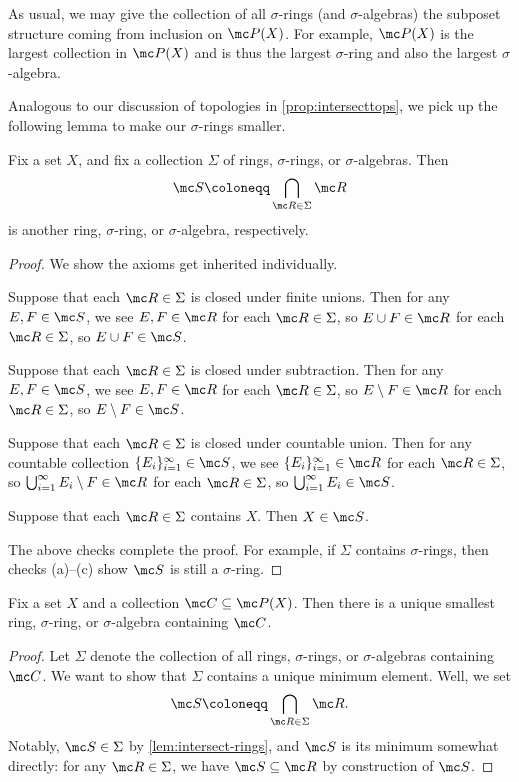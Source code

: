 \documentclass[../notes.tex]{subfiles}
\begin{document}
As usual, we may give the collection of all $\sigma$-rings (and $\sigma$-algebras) the subposet structure coming from inclusion on $\mc P(X)$. For example, $\mc P(X)$ is the largest collection in $\mc P(X)$ and is thus the largest $\sigma$-ring and also the largest $\sigma$-algebra.

Analogous to our discussion of topologies in \autoref{prop:intersecttops}, we pick up the following lemma to make our $\sigma$-rings smaller.
\begin{lemma} \label{lem:intersect-rings}
	Fix a set $X$, and fix a collection $\Sigma$ of rings, $\sigma$-rings, or $\sigma$-algebras. Then
	\[\mc S\coloneqq\bigcap_{\mc R\in\Sigma}\mc R\]
	is another ring, $\sigma$-ring, or $\sigma$-algebra, respectively.
\end{lemma}
\begin{proof}
	We show the axioms get inherited individually.
	\begin{listalph}
		\item Suppose that each $\mc R\in\Sigma$ is closed under finite unions. Then for any $E,F\in\mc S$, we see $E,F\in\mc R$ for each $\mc R\in\Sigma$, so $E\cup F\in\mc R$ for each $\mc R\in\Sigma$, so $E\cup F\in\mc S$.
		\item Suppose that each $\mc R\in\Sigma$ is closed under subtraction. Then for any $E,F\in\mc S$, we see $E,F\in\mc R$ for each $\mc R\in\Sigma$, so $E\setminus F\in\mc R$ for each $\mc R\in\Sigma$, so $E\setminus F\in\mc S$.
		\item Suppose that each $\mc R\in\Sigma$ is closed under countable union. Then for any countable collection $\{E_i\}_{i=1}^\infty\in\mc S$, we see $\{E_i\}_{i=1}^\infty\in\mc R$ for each $\mc R\in\Sigma$, so $\bigcup_{i=1}^\infty E_i\setminus F\in\mc R$ for each $\mc R\in\Sigma$, so $\bigcup_{i=1}^\infty E_i\in\mc S$.
		\item Suppose that each $\mc R\in\Sigma$ contains $X$. Then $X\in\mc S$.
	\end{listalph}
	The above checks complete the proof. For example, if $\Sigma$ contains $\sigma$-rings, then checks (a)--(c) show $\mc S$ is still a $\sigma$-ring.
\end{proof}
\begin{corollary} \label{cor:get-small-sigma-ring}
	Fix a set $X$ and a collection $\mc C\subseteq\mc P(X)$. Then there is a unique smallest ring, $\sigma$-ring, or $\sigma$-algebra containing $\mc C$.
\end{corollary}
\begin{proof}
	Let $\Sigma$ denote the collection of all rings, $\sigma$-rings, or $\sigma$-algebras containing $\mc C$. We want to show that $\Sigma$ contains a unique minimum element. Well, we set
	\[\mc S\coloneqq\bigcap_{\mc R\in\Sigma}\mc R.\]
	Notably, $\mc S\in\Sigma$ by \autoref{lem:intersect-rings}, and $\mc S$ is its minimum somewhat directly: for any $\mc R\in\Sigma$, we have $\mc S\subseteq\mc R$ by construction of $\mc S$.
\end{proof}
\end{document}
